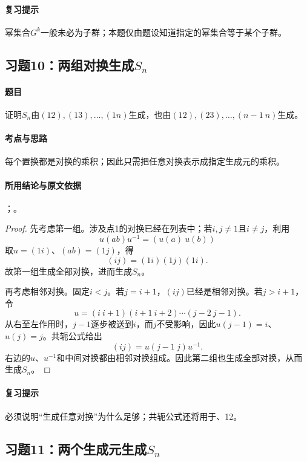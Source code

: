 \paragraph{复习提示}
幂集合$G^k$一般未必为子群；本题仅由题设知道指定的幂集合等于某个子群。


\subsection{习题10：\texorpdfstring{两组对换生成$S_n$}{两组对换生成Sn}}
\label{ex:2:10}

\paragraph{题目}
证明$S_n$由$(12),(13),\ldots,(1n)$生成，也由$(12),(23),\ldots,(n-1\ n)$生成。

\paragraph{考点与思路}
每个置换都是对换的乘积；因此只需把任意对换表示成指定生成元的乘积。

\paragraph{所用结论与原文依据}
；。


\begin{proof}
先考虑第一组。涉及点1的对换已经在列表中；若$i,j\ne1$且$i\ne j$，利用
\[
u(ab)u^{-1}=(u(a)\ u(b))
\]
取$u=(1i)$、$(ab)=(1j)$，得
\[
(ij)=(1i)(1j)(1i).
\]
故第一组生成全部对换，进而生成$S_n$。

再考虑相邻对换。固定$i<j$。若$j=i+1$，$(ij)$已经是相邻对换。若$j>i+1$，令
\[
u=(i\ i+1)(i+1\ i+2)\cdots(j-2\ j-1).
\]
从右至左作用时，$j-1$逐步被送到$i$，而$j$不受影响，因此$u(j-1)=i$、$u(j)=j$。共轭公式给出
\[
(ij)=u(j-1\ j)u^{-1}.
\]
右边的$u$、$u^{-1}$和中间对换都由相邻对换组成。因此第二组也生成全部对换，从而生成$S_n$。
\end{proof}

\paragraph{复习提示}
必须说明“生成任意对换”为什么足够；共轭公式还将用于、12。


\subsection{习题11：\texorpdfstring{两个生成元生成$S_n$}{两个生成元生成Sn}}
\label{ex:2:11}


